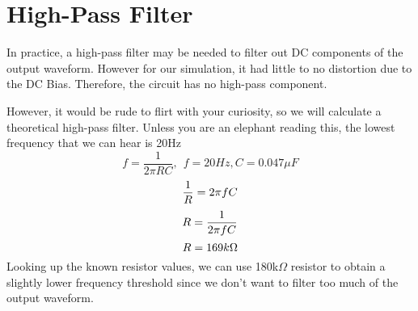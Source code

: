 \section{High-Pass Filter}
    In practice, a high-pass filter may be needed to filter out DC components of the output waveform. However for our simulation, it had little to no distortion due to the DC Bias. Therefore, the circuit has no high-pass component. 
    
    However, it would be rude to flirt with your curiosity, so we will calculate a theoretical high-pass filter.
    Unless you are an elephant reading this, the lowest frequency that we can hear is 20Hz 
\begin{equation*}
    f=\frac{1}{2\pi RC}, \ \ f=20Hz, C=0.047\mu F
\end{equation*}
\begin{equation*}
    \frac{1}{R} = 2\pi fC \\
\end{equation*}
\begin{equation*}
    R = \frac{1}{2\pi fC} \\
\end{equation*}
\begin{equation*}
    R = 169k\Omega  \\
\end{equation*}
Looking up the known resistor values, we can use 180k$\Omega$ resistor to obtain a slightly lower frequency threshold since we don't want to filter too much of the output waveform.